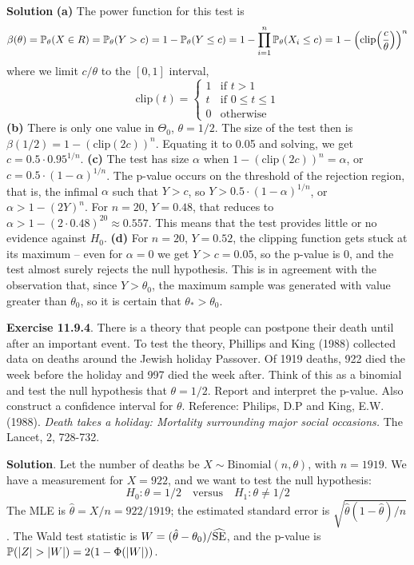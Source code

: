 \textbf{Solution}
\textbf{(a)} The power function for this test is
\[
\beta(\theta) = \PROB_\theta(X \in R) = \PROB_\theta(Y > c) = 1 - \PROB_\theta(Y \leq c) = 1 - \prod_{i=1}^{n} \PROB_\theta(X_{i} \leq c) = 1 - \left(\text{clip}\left(\frac{c}{\theta}\right)\right)^{n}
\]
where we limit \(c/\theta\) to the \([0, 1]\) interval,
\[
\text{clip}(t) = \begin{cases} 1 & \text{if } t > 1 \\ t & \text{if } 0 \leq t \leq 1 \\ 0 & \text{otherwise} \end{cases}
\]
\textbf{(b)} There is only one value in \(\Theta_{0}\), \(\theta = 1/2\).
The size of the test then is
\(\beta(1/2) = 1 - \left(\text{clip}\left(2c\right)\right)^{n}\). Equating
it to 0.05 and solving, we get \(c = 0.5 \cdot 0.95^{1/n}\).
\textbf{(c)} The test has size \(\alpha\) when $ 1 -
\left(\text{clip}\left(2c\right)\right)^{n} = \alpha$, or
\(c = 0.5 \cdot (1 - \alpha)^{1/n}\). The p-value occurs on the
threshold of the rejection region, that is, the infimal \(\alpha\) such
that \(Y > c\), so \(Y > 0.5 \cdot (1 - \alpha)^{1/n}\), or
\(\alpha > 1 - (2Y)^{n}\).
For \(n = 20\), \(Y = 0.48\), that reduces to
\(\alpha > 1 - (2\cdot 0.48)^{20} \approx 0.557\). This means that the
test provides little or no evidence against \(H_{0}\).
\textbf{(d)} For \(n = 20\), \(Y = 0.52\), the clipping function gets
stuck at its maximum -- even for \(\alpha = 0\) we get \(Y > c = 0.05\),
so the p-value is 0, and the test almost surely rejects the null
hypothesis. This is in agreement with the observation that, since
\(Y > \theta_{0}\), the maximum sample was generated with value greater
than \(\theta_{0}\), so it is certain that \(\theta_{*} > \theta_{0}\).

\textbf{Exercise 11.9.4}. There is a theory that people can postpone
their death until after an important event. To test the theory, Phillips
and King (1988) collected data on deaths around the Jewish holiday
Passover. Of 1919 deaths, 922 died the week before the holiday and 997
died the week after. Think of this as a binomial and test the null
hypothesis that \(\theta = 1/2\). Report and interpret the p-value. Also
construct a confidence interval for \(\theta\).
Reference: Philips, D.P and King, E.W. (1988). \emph{Death takes a
holiday: Mortality surrounding major social occasions.} The Lancet, 2,
728-732.

\textbf{Solution}. Let the number of deaths be
\(X \sim \text{Binomial}(n, \theta)\), with \(n = 1919\). We have a
measurement for \(X = 922\), and we want to test the null hypothesis:
\[
H_{0}:  \theta = 1/2 \quad \text{versus} \quad H_{1}: \theta \neq 1/2
\]
The MLE is \(\hat{\theta} = X / n = 922 / 1919\); the estimated standard
error is \(\sqrt{\hat{\theta}(1 - \hat{\theta})/n}\). The Wald test
statistic is \(W = (\hat{\theta} - \theta_{0}) / \widehat{\operatorname{\mathrm{SE}}}\), and
the p-value is \(\operatorname{\mathbb{P}}(|Z| > |W|) = 2(1 - \Phi(|W|))\).

